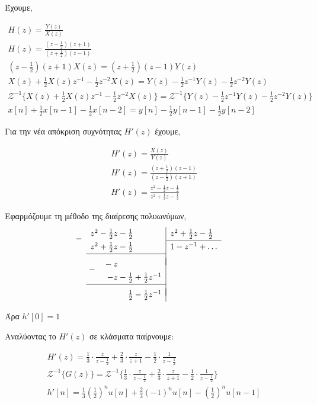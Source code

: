 \documentclass{assignment}
\newcommand{\dropsign}[1]{\smash{\llap{\raisebox{-.5\normalbaselineskip}{$#1$\hspace{2\arraycolsep}}}}}%
\newcommand{\longdivline}{\cline{1-1} \\[\dimexpr-\normalbaselineskip+\jot]}
\begin{document}
\begin{answers}
\answer

Έχουμε,

\begin{gather*}
H(z) = \frac{Y(z)}{X(z)} \\
H(z) = \frac{\left(z-\frac{1}{2}\right)(z+1)}{\left(z+\frac{1}{2}\right)(z-1)} \\
\left(z-\frac{1}{2}\right)(z+1)X(z) = \left(z+\frac{1}{2}\right)(z-1)Y(z) \\
X(z) + \frac{1}{2}X(z)z^{-1} - \frac{1}{2}z^{-2}X(z) = Y(z) - \frac{1}{2}z^{-1}Y(z) - \frac{1}{2}z^{-2}Y(z)\\
\mathscr{Z}^{-1}\bigg\{X(z) + \frac{1}{2}X(z)z^{-1} - \frac{1}{2}z^{-2}X(z)\bigg\} = 
\mathscr{Z}^{-1}\bigg\{Y(z) - \frac{1}{2}z^{-1}Y(z) - \frac{1}{2}z^{-2}Y(z)\bigg\} \\
x[n] + \frac{1}{2}x[n-1] - \frac{1}{2}x[n-2] = y[n] - \frac{1}{2}y[n-1] - \frac{1}{2}y[n-2]
\end{gather*}

\answer
Για την νέα απόκριση συχνότητας $H'(z)$ έχουμε,

\begin{gather*}
H'(z) = \frac{X(z)}{Y(z)} \\
H'(z) = \frac{\left(z+\frac{1}{2}\right)(z-1)}{\left(z-\frac{1}{2}\right)(z+1)}\\
H'(z) = \frac{z^2-\frac{1}{2}z-\frac{1}{2}}{z^2+\frac{1}{2}z-\frac{1}{2}}
\end{gather*}

Εφαρμόζουμε τη μέθοδο της διαίρεσης πολυωνύμων,
\begin{equation*}
  \setlength\extrarowheight{2pt}
  \begin{array}{r|l}
    \dropsign{-} z^2 - \frac{1}{2}z-\frac{1}{2}\hphantom{{}+{}\frac{0}{1}z^{-1}}& z^2+\frac{1}{2}z-\frac{1}{2} \\[2pt] \cline{2-2}
    z^2+\frac{1}{2}z-\frac{1}{2}\hphantom{{}+{}\frac{0}{1}z^{-1}}& 1 - z^{-1} + \dots \\[2pt] \longdivline
     \dropsign{-} -z\hphantom{{}-{}\frac{0}{1}{}+{}\frac{0}{1}z^{-1}}&\\[2pt]
                  -z-\frac{1}{2}+\frac{1}{2}z^{-1}&\\[2pt] \longdivline
                     \frac{1}{2}-\frac{1}{2}z^{-1}&\\[2pt]
  \end{array}
\end{equation*}

Άρα $h'[0] = 1$

Αναλύοντας το $H'(z)$ σε κλάσματα παίρνουμε:

\begin{gather*}
Η'(z) = \frac{1}{3}\cdot\frac{z}{z-\frac{1}{2}} + \frac{2}{3}\cdot\frac{z}{z+1} - \frac{1}{2}\cdot\frac{1}{z-\frac{1}{2}}\\
\mathscr{Z}^{-1}\bigg\{G(z)\bigg\} = \mathscr{Z}^{-1}\bigg\{\frac{1}{3}\cdot\frac{z}{z-\frac{1}{2}} + \frac{2}{3}\cdot\frac{z}{z+1} - \frac{1}{2}\cdot\frac{1}{z-\frac{1}{2}}\bigg\}\\
h'[n] = \frac{1}{3}\left(\frac{1}{2}\right)^nu[n] + \frac{2}{3}(-1)^nu[n] - \left(\frac{1}{2}\right)^nu[n-1]
\end{gather*}

\end{answers}
\end{document}
